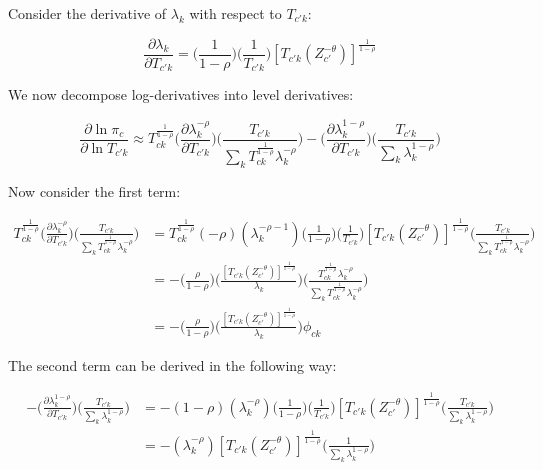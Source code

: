 \documentclass[10pt]{article}
\begin{document}
Consider the derivative of $\lambda_k$ with respect to $T_{{c'}k}$:

\begin{equation*}
    \frac{\partial{\lambda_{k}}}{\partial{T_{{c'}k}}} = \Big(\frac{1}{1-\rho}\Big)\Big(\frac{1}{T_{{c'}k}}\Big)[{T_{{c'}k}}(Z_{c'}^{-\theta})]^{\frac{1}{1-\rho}}
\end{equation*}

We now decompose log-derivatives into level derivatives:

\begin{equation*}
    \frac{\partial\ln{\pi_{c}}}{\partial\ln{T_{{c'}k}}} \approx {T^{\frac{1}{1-\rho}}_{ck}}\Big(\frac{\partial\lambda_{k}^{-\rho}}{\partial{T_{{c'}k}}}\Big)\Big(\frac{T_{{c'}k}}{{\sum\limits_{k}{T^{\frac{1}{1-\rho}}_{ck}}\lambda_{k}^{-\rho}}}\Big) - \Big(\frac{\partial\lambda_{k}^{1-\rho}}{\partial{T_{{c'}k}}}\Big)\Big(\frac{T_{{c'}k}}{{\sum\limits_{k}\lambda_{k}^{1-\rho}}}\Big)
\end{equation*}

Now consider the first term:

\begin{align*}
    {T^{\frac{1}{1-\rho}}_{ck}}\Big(\frac{\partial\lambda_{k}^{-\rho}}{\partial{T_{{c'}k}}}\Big)\Big(\frac{T_{{c'}k}}{{\sum\limits_{k}{T^{\frac{1}{1-\rho}}_{ck}}\lambda_{k}^{-\rho}}}\Big) & = {T^{\frac{1}{1-\rho}}_{ck}}(-\rho)(\lambda_{k}^{-\rho-1})\Big(\frac{1}{1-\rho}\Big)\Big(\frac{1}{T_{{c'}k}}\Big)[{T_{{c'}k}}(Z_{c'}^{-\theta})]^{\frac{1}{1-\rho}}\Big(\frac{T_{{c'}k}}{{\sum\limits_{k}{T^{\frac{1}{1-\rho}}_{ck}}\lambda_{k}^{-\rho}}}\Big) \\ &= -\Bigg(\frac{\rho}{1-\rho}\Bigg)\Bigg(\frac{[{T_{{c'}k}}(Z_{c'}^{-\theta})]^{\frac{1}{1-\rho}}}{\lambda_{k}}\Bigg)\Bigg(\frac{T^{\frac{1}{1-\rho}}_{ck}{\lambda^{-\rho}_{k}}}{{\sum\limits_{k}{T^{\frac{1}{1-\rho}}_{ck}}\lambda_{k}^{-\rho}}}\Bigg)\\ &= -\Bigg(\frac{\rho}{1-\rho}\Bigg)\Bigg(\frac{[{T_{{c'}k}}(Z_{c'}^{-\theta})]^{\frac{1}{1-\rho}}}{\lambda_{k}}\Bigg){\phi_{ck}}
\end{align*}

The second term can be derived in the following way:

\begin{align*}
    - \Big(\frac{\partial\lambda_{k}^{1-\rho}}{\partial{T_{{c'}k}}}\Big)\Big(\frac{T_{{c'}k}}{{\sum\limits_{k}\lambda_{k}^{1-\rho}}}\Big) & = - (1-\rho)(\lambda_{k}^{-\rho})\Big(\frac{1}{1-\rho}\Big)\Big(\frac{1}{T_{{c'}k}}\Big)[{T_{{c'}k}}(Z_{c'}^{-\theta})]^{\frac{1}{1-\rho}}\Big(\frac{T_{{c'}k}}{{\sum\limits_{k}\lambda_{k}^{1-\rho}}}\Big) \\ &= - (\lambda_{k}^{-\rho})[{T_{{c'}k}}(Z_{c'}^{-\theta})]^{\frac{1}{1-\rho}}\Big(\frac{1}{{\sum\limits_{k}\lambda_{k}^{1-\rho}}}\Big)
\end{align*}
\end{document}

